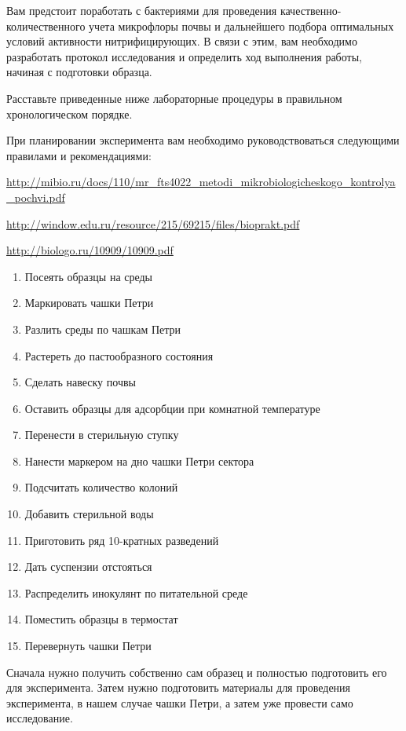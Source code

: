 
Вам предстоит поработать с бактериями для проведения качественно- количественного учета микрофлоры 
почвы и дальнейшего подбора оптимальных условий  активности нитрифицирующих. В связи с этим,  
вам необходимо разработать протокол исследования и определить ход выполнения работы, начиная с 
подготовки образца.

Расставьте приведенные ниже лабораторные процедуры в правильном хронологическом порядке. 

При планировании эксперимента вам необходимо руководствоваться следующими правилами и рекомендациями:

\noindent\url{http://mibio.ru/docs/110/mr_fts4022_metodi_mikrobiologicheskogo_kontrolya_pochvi.pdf}

\noindent\url{http://window.edu.ru/resource/215/69215/files/bioprakt.pdf}

\noindent\url{http://biologo.ru/10909/10909.pdf}

\begin{enumerate}
    \item Посеять образцы на среды
    \item Маркировать чашки Петри
    \item Разлить среды по чашкам Петри
    \item Растереть до пастообразного состояния
    \item Сделать навеску почвы
    \item Оставить образцы для адсорбции при комнатной температуре
    \item Перенести в стерильную ступку
    \item Нанести маркером на дно чашки Петри сектора
    \item Подсчитать количество колоний
    \item Добавить стерильной воды
    \item Приготовить ряд 10-кратных разведений
    \item Дать суспензии отстояться
    \item Распределить инокулянт по питательной среде
    \item Поместить образцы в термостат
    \item Перевернуть чашки Петри
\end{enumerate}

\explanationSection

Сначала нужно получить собственно сам образец и полностью подготовить его для эксперимента. Затем нужно подготовить материалы для проведения эксперимента, в нашем случае чашки Петри, а затем уже провести само исследование.

